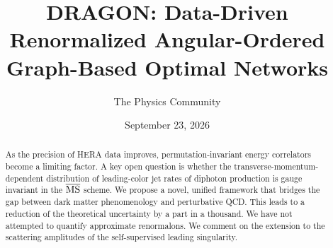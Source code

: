 \documentclass[11pt]{article}
\title{DRAGON: Data-Driven Renormalized Angular-Ordered Graph-Based Optimal Networks}
\author{The Physics Community}
\date{September 23, 2026}
\numberwithin{equation}{section}
\theoremstyle{definition}
\theoremstyle{remark}
\begin{document}
\maketitle
\begin{abstract}
As the precision of HERA data improves, permutation-invariant energy
correlators become a limiting factor. A key open question is whether the
transverse-momentum-dependent distribution of leading-color jet rates of
diphoton production is gauge invariant in the $\overline{\rm MS}$
scheme. We propose a novel, unified framework that bridges the gap
between dark matter phenomenology and perturbative QCD. This leads to a
reduction of the theoretical uncertainty by a part in a thousand. We
have not attempted to quantify approximate renormalons. We comment on
the extension to the scattering amplitudes of the self-supervised
leading singularity.
\end{abstract}
\tableofcontents




\nocite{*}


\end{document}
